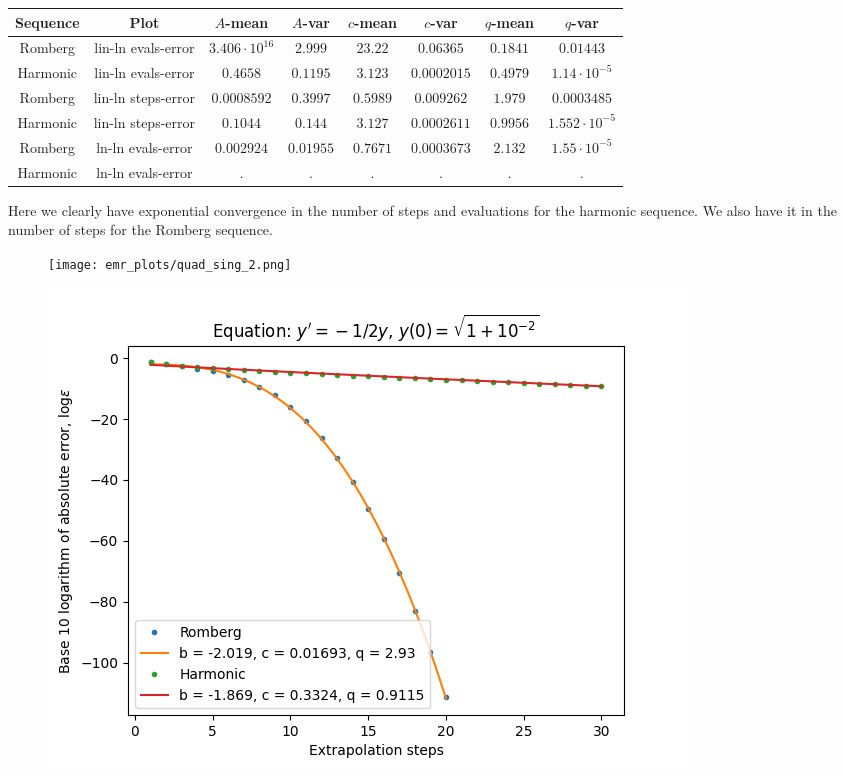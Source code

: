 \begin{table}[H]
    \centering
    \small
     \begin{tabular}{c|c||c|c|c|c|c|c}
Sequence & Plot & \(A\)-mean & \(A\)-var & \(c\)-mean & \(c\)-var & \(q\)-mean & \(q\)-var\\\hline
Romberg & lin-ln evals-error & \(3.406\cdot 10^{16}\) & \(2.999\) & \(23.22\) & \(0.06365\) & \(0.1841\) & \(0.01443\) \\
Harmonic & lin-ln evals-error & \(0.4658\) & \(0.1195\) & \(3.123\) & \(0.0002015\) & \(0.4979\) & \(1.14\cdot 10^{-5}\) \\
Romberg & lin-ln steps-error & \(0.0008592\) & \(0.3997\) & \(0.5989\) & \(0.009262\) & \(1.979\) & \(0.0003485\) \\
Harmonic & lin-ln steps-error & \(0.1044\) & \(0.144\) & \(3.127\) & \(0.0002611\) & \(0.9956\) & \(1.552\cdot 10^{-5}\) \\
Romberg & ln-ln evals-error & \(0.002924\) & \(0.01955\) & \(0.7671\) & \(0.0003673\) & \(2.132\) & \(1.55\cdot 10^{-5}\) \\
Harmonic & ln-ln evals-error & . & . & . & . & . & . \\
    \end{tabular}
    \label{tab:my_label}
\end{table}

Here we clearly have exponential convergence in the number of steps and evaluations for the harmonic sequence. We also have it in the number of steps for the Romberg sequence.

\begin{figure}[H]
\centering
\begin{minipage}{0.45\textwidth}
\centering
\texttt{[image: emr\_plots/quad\_sing\_2.png]}
\end{minipage}
\begin{minipage}{0.45\textwidth}
\centering
\includegraphics[scale=0.45]{emr_plots/quad_sing_2_hp_steps.png}
\end{minipage}
\end{figure}

